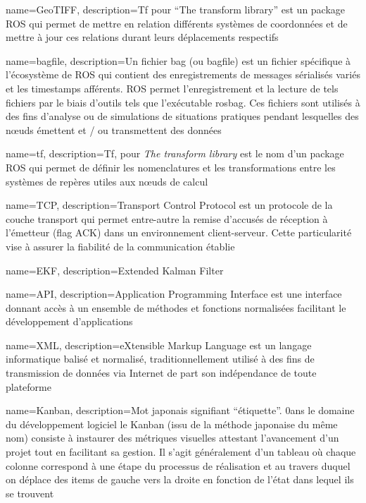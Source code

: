 {
  name={GeoTIFF},
    description={Tf pour ``The transform library'' est un package ROS qui permet de mettre en relation différents systèmes de coordonnées et de mettre à jour ces relations durant leurs déplacements respectifs}
}

{
  name={bagfile},
    description={Un fichier bag (ou bagfile) est un fichier spécifique à l'écosystème de ROS qui contient des enregistrements de messages sérialisés variés et les timestamps afférents. 
    ROS permet l'enregistrement et la lecture de tels fichiers par le biais d'outils tels que l'exécutable rosbag.
    Ces fichiers sont utilisés à des fins d'analyse ou de simulations de situations pratiques pendant lesquelles des n\oe{}uds émettent et / ou transmettent des données}
}

{
  name={tf},
    description={Tf, pour \emph{The transform library} est le nom d'un package ROS qui permet de définir les nomenclatures et les transformations entre les systèmes de repères utiles aux n\oe{}uds de calcul}
}

{
  name={TCP},
    description={Transport Control Protocol est un protocole de la couche transport qui permet entre-autre la remise d'accusés de réception à l'émetteur (flag ACK) dans un environnement client-serveur. 
    Cette particularité vise à assurer la fiabilité de la communication établie}
}

{
  name={EKF},
    description={Extended Kalman Filter}
}

{
  name={API},
    description={Application Programming Interface est une interface donnant accès à un ensemble de méthodes et fonctions normalisées facilitant le développement d'applications}
}

{
  name={XML},
    description={eXtensible Markup Language est un langage informatique balisé et normalisé, traditionnellement utilisé à des fins de transmission de données via Internet de part son indépendance de toute plateforme}
}

{
  name={Kanban},
    description={Mot japonais signifiant  ``étiquette''. 0ans le domaine du développement logiciel le Kanban (issu de la méthode japonaise du même nom) consiste à instaurer des métriques visuelles attestant l'avancement d'un projet tout en facilitant sa gestion. 
    Il s'agit généralement d'un tableau où chaque colonne correspond à une étape du processus de réalisation et au travers duquel on déplace des items de gauche vers la droite en fonction de l'état dans lequel ils se trouvent}
}

